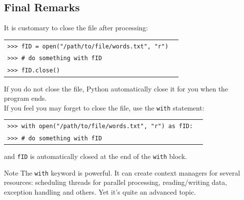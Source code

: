 \documentclass[t,handout,9pt]{beamer}
\begin{document}
\subsection{Final Remarks}
\begin{frame}
\vfill
It is customary to close the file after processing:
\begin{table}[]
\begin{flushleft}
\begin{tabular}{ll}
\texttt{>{}>{}> fID = open("/path/to/file/words.txt", "r")} &  \\
\texttt{>{}>{}> \# do something with fID} &  \\
\texttt{>{}>{}> fID.close()} &  \\
\end{tabular}
\end{flushleft}
\end{table}
If you do not close the file, Python automatically close it for you when the program ends.\\
If you feel you may forget to close the file, use the \texttt{with} statement:
\begin{table}[]
\begin{flushleft}
\begin{tabular}{ll}
\texttt{>{}>{}> with open("/path/to/file/words.txt", "r") as fID:} &  \\
\texttt{>{}>{}> \qquad \# do something with fID} &  \\
\end{tabular}
\end{flushleft}
\end{table}
and \texttt{fID} is automatically closed at the end of the \texttt{with} block.
\begin{block}{Note}
The \texttt{with} keyword is powerful. It can create context managers for several resources: scheduling threads for parallel processing, reading/writing data, exception handling and others. Yet it's quite an advanced topic.
\end{block}
\vfill
\end{frame}
%
\end{document}
